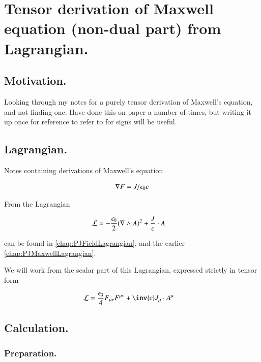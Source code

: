 \chapter{Tensor derivation of Maxwell equation (non-dual part) from Lagrangian. }
\label{chap:maxwellTensorFromLagrangian}
\date{ April 20, 2009.  $RCSfile: maxwellTensorFromLagrangian.tex,v $ Last $Revision: 1.6 $ $Date: 2009/06/15 00:48:32 $ }

\section{Motivation. }

Looking through my notes for a purely tensor derivation of Maxwell's equation, and not finding one.  Have done this on
paper a number of times, but writing it up once for reference to refer to for signs will be useful.

\section{Lagrangian. }

Notes containing derivations of Maxwell's equation

\begin{align}\label{eqn:maxTenLag:maxwell}
\nabla F = J/\epsilon_0 c
\end{align}

From the Lagrangian

\begin{align}\label{eqn:maxTenLag:maxlag}
\mathcal{L} &= -\frac{\epsilon_0}{2} (\nabla \wedge A)^2 + \frac{J}{c} \cdot A
\end{align}

can be found in \ref{chap:PJFieldLagrangian}, and the earlier \ref{chap:PJMaxwellLagrangian}.

We will work from the scalar part of this Lagrangian, expressed strictly in tensor form

\begin{align}
\LL &= \frac{\epsilon_0}{4} F_{\mu\nu}F^{\mu\nu} + \inv{c} J_\mu \cdot A^\mu
\end{align}

\section{Calculation. }

\subsection{Preparation. }

